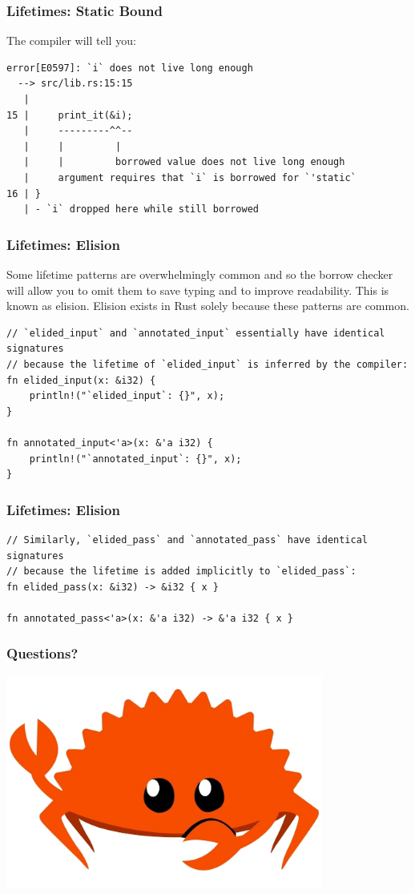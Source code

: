 \documentclass[aspectratio=1610,t]{beamer}
\begin{document}

\begin{frame}[fragile]
\frametitle{Lifetimes: Static Bound}
The compiler will tell you:
\begin{verbatim}
error[E0597]: `i` does not live long enough
  --> src/lib.rs:15:15
   |
15 |     print_it(&i);
   |     ---------^^--
   |     |         |
   |     |         borrowed value does not live long enough
   |     argument requires that `i` is borrowed for `'static`
16 | }
   | - `i` dropped here while still borrowed
\end{verbatim}
\end{frame}


\begin{frame}[fragile]
\frametitle{Lifetimes: Elision}
Some lifetime patterns are overwhelmingly common and so the borrow checker will allow you to omit them to save typing and to improve readability. This is known as elision. Elision exists in Rust solely because these patterns are common.
\begin{verbatim}
// `elided_input` and `annotated_input` essentially have identical signatures
// because the lifetime of `elided_input` is inferred by the compiler:
fn elided_input(x: &i32) {
    println!("`elided_input`: {}", x);
}

fn annotated_input<'a>(x: &'a i32) {
    println!("`annotated_input`: {}", x);
}
\end{verbatim}
\end{frame}


\begin{frame}[fragile]
\frametitle{Lifetimes: Elision}
\begin{verbatim}
// Similarly, `elided_pass` and `annotated_pass` have identical signatures
// because the lifetime is added implicitly to `elided_pass`:
fn elided_pass(x: &i32) -> &i32 { x }

fn annotated_pass<'a>(x: &'a i32) -> &'a i32 { x }
\end{verbatim}
\end{frame}


\begin{frame}
\frametitle{Questions?}
\begin{center}
\includegraphics[width=\textwidth,height=7cm,keepaspectratio]{images/crab.jpg}
\end{center}
\end{frame}

\end{document}

